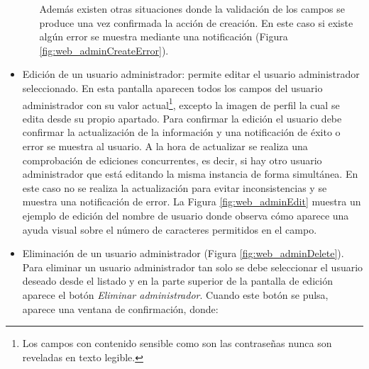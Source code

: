 \documentclass[12pt,a4paper, twoside]{report}
\begin{document}
\begin{itemize}
\begin{itemize}
			Además existen otras situaciones donde la validación de los campos se produce una vez confirmada la acción de creación. En este caso si existe algún error se muestra mediante una notificación (Figura \ref{fig:web_adminCreateError}).		
			
			
		\end{itemize}
			
		\item Edición de un usuario administrador: permite editar el usuario administrador seleccionado. En esta pantalla aparecen todos los campos del usuario administrador con su valor actual\footnote{Los campos con contenido sensible como son las contraseñas nunca son reveladas en texto legible.}, excepto la imagen de perfil la cual se edita desde su propio apartado. Para confirmar la edición el usuario debe confirmar la actualización de la información y una notificación de éxito o error se muestra al usuario. A la hora de actualizar se realiza una comprobación de ediciones concurrentes, es decir, si hay otro usuario administrador que está editando la misma instancia de forma simultánea. En este caso no se realiza la actualización para evitar inconsistencias y se muestra una notificación de error. La Figura \ref{fig:web_adminEdit} muestra un ejemplo de edición del nombre de usuario donde observa cómo aparece una ayuda visual sobre el número de caracteres permitidos en el campo.
				

		\item Eliminación de un usuario administrador (Figura \ref{fig:web_adminDelete}). Para eliminar un usuario administrador tan solo se debe seleccionar el usuario deseado desde el listado y en la parte superior de la pantalla de edición aparece el botón \textit{Eliminar administrador}. Cuando este botón se pulsa, aparece una ventana de confirmación, donde:
		

\end{itemize}
\end{document}

